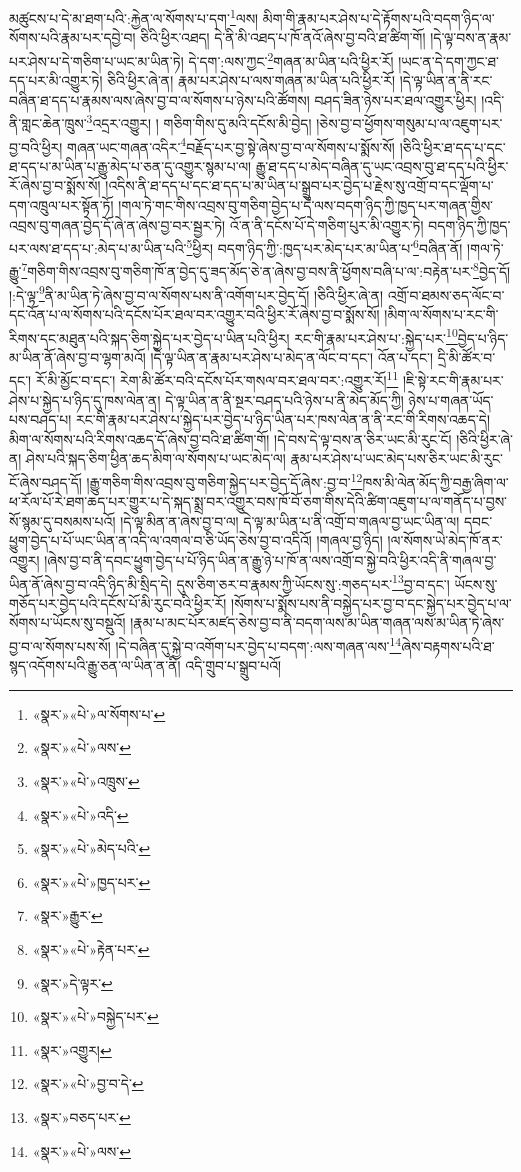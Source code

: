མཚུངས་པ་དེ་མ་ཐག་པའི་:རྐྱེན་ལ་སོགས་པ་དག་\footnote{«སྣར་»«པེ་»ལ་སོགས་པ་}ལས། མིག་གི་རྣམ་པར་ཤེས་པ་དེ་རྟོགས་པའི་བདག་ཉིད་ལ་སོགས་པའི་རྣམ་པར་དབྱེ་བ། ཅིའི་ཕྱིར་འཐད། དེ་ནི་མི་འཐད་པ་ཁོ་ནའོ་ཞེས་བྱ་བའི་ཐ་ཚིག་གོ། །དེ་ལྟ་བས་ན་རྣམ་པར་ཤེས་པ་དེ་གཅིག་པ་ཡང་མ་ཡིན་ཏེ། དེ་དག་:ལས་ཀྱང་\footnote{«སྣར་»«པེ་»ལས་}གཞན་མ་ཡིན་པའི་ཕྱིར་རོ། །ཡང་ན་དེ་དག་ཀྱང་ཐ་དད་པར་མི་འགྱུར་ཏེ། ཅིའི་ཕྱིར་ཞེ་ན། རྣམ་པར་ཤེས་པ་ལས་གཞན་མ་ཡིན་པའི་ཕྱིར་རོ། །དེ་ལྟ་ཡིན་ན་ནི་རང་བཞིན་ཐ་དད་པ་རྣམས་ལས་ཞེས་བྱ་བ་ལ་སོགས་པ་ཉེས་པའི་ཚོགས། བཤད་ཟིན་ཉེས་པར་ཐལ་འགྱུར་ཕྱིར། །འདི་ནི་གླང་ཆེན་ཁྲུས་\footnote{«སྣར་»«པེ་»འཁྲུས་}འདྲར་འགྱུར། །
གཅིག་གིས་དུ་མའི་དངོས་མི་བྱེད། །ཅེས་བྱ་བ་ཕྱོགས་གསུམ་པ་ལ་འཇུག་པར་བྱ་བའི་ཕྱིར། གཞན་ཡང་གཞན་འདིར་\footnote{«སྣར་»«པེ་»འདི་}བརྗོད་པར་བྱ་སྟེ་ཞེས་བྱ་བ་ལ་སོགས་པ་སྨོས་སོ། །ཅིའི་ཕྱིར་ཐ་དད་པ་དང་ཐ་དད་པ་མ་ཡིན་པ་རྒྱུ་མེད་པ་ཅན་དུ་འགྱུར་སྙམ་པ་ལ། རྒྱུ་ཐ་དད་པ་མེད་བཞིན་དུ་ཡང་འབྲས་བུ་ཐ་དད་པའི་ཕྱིར་རོ་ཞེས་བྱ་བ་སྨོས་སོ། །འདིས་ནི་ཐ་དད་པ་དང་ཐ་དད་པ་མ་ཡིན་པ་སྒྲུབ་པར་བྱེད་པ་རྗེས་སུ་འགྲོ་བ་དང་ལྡོག་པ་དག་འཁྲུལ་པར་སྟོན་ཏོ། །གལ་ཏེ་གང་གིས་འབྲས་བུ་གཅིག་བྱེད་པ་དེ་ལས་བདག་ཉིད་ཀྱི་ཁྱད་པར་གཞན་གྱིས་འབྲས་བུ་གཞན་བྱེད་དོ་ཞེ་ན་ཞེས་བྱ་བར་སྦྱར་ཏེ། འོ་ན་ནི་དངོས་པོ་དེ་གཅིག་པུར་མི་འགྱུར་ཏེ། བདག་ཉིད་ཀྱི་ཁྱད་པར་ལས་ཐ་དད་པ་:མེད་པ་མ་ཡིན་པའི་\footnote{«སྣར་»«པེ་»མེད་པའི་}ཕྱིར། བདག་ཉིད་ཀྱི་:ཁྱད་པར་མེད་པར་མ་ཡིན་པ་\footnote{«སྣར་»«པེ་»ཁྱད་པར་}བཞིན་ནོ། །གལ་ཏེ་རྒྱུ་\footnote{«སྣར་»རྒྱུར་}གཅིག་གིས་འབྲས་བུ་གཅིག་ཁོ་ན་བྱེད་དུ་ཟད་མོད་ཅེ་ན་ཞེས་བྱ་བས་ནི་ཕྱོགས་བཞི་པ་ལ་:བརྟེན་པར་\footnote{«སྣར་»«པེ་»རྟེན་པར་}བྱེད་དོ། །:དེ་ལྟ་\footnote{«སྣར་»དེ་ལྟར་}ནི་མ་ཡིན་ཏེ་ཞེས་བྱ་བ་ལ་སོགས་པས་ནི་འགོག་པར་བྱེད་དོ། །ཅིའི་ཕྱིར་ཞེ་ན། འགྲོ་བ་ཐམས་ཅད་ལོང་བ་དང་འོན་པ་ལ་སོགས་པའི་དངོས་པོར་ཐལ་བར་འགྱུར་བའི་ཕྱིར་རོ་ཞེས་བྱ་བ་སྨོས་སོ། །མིག་ལ་སོགས་པ་རང་གི་རིགས་དང་མཐུན་པའི་སྐད་ཅིག་སྐྱེད་པར་བྱེད་པ་ཡིན་པའི་ཕྱིར། རང་གི་རྣམ་པར་ཤེས་པ་:སྐྱེད་པར་\footnote{«སྣར་»«པེ་»བསྐྱེད་པར་}བྱེད་པ་ཉིད་མ་ཡིན་ནོ་ཞེས་བྱ་བ་ལྷག་མའོ། །དེ་ལྟ་ཡིན་ན་རྣམ་པར་ཤེས་པ་མེད་ན་ལོང་བ་དང་། འོན་པ་དང་། དྲི་མི་ཚོར་བ་དང་། རོ་མི་མྱོང་བ་དང་། རེག་མི་ཚོར་བའི་དངོས་པོར་གསལ་བར་ཐལ་བར་:འགྱུར་རོ།\footnote{«སྣར་»འགྱུར།} །ཇི་སྟེ་རང་གི་རྣམ་པར་ཤེས་པ་སྐྱེད་པ་ཉིད་དུ་ཁས་ལེན་ན། དེ་ལྟ་ཡིན་ན་ནི་སྔར་བཤད་པའི་ཉེས་པ་ནི་མེད་མོད་ཀྱི། ཉེས་པ་གཞན་ཡོད་པས་བཤད་པ། རང་གི་རྣམ་པར་ཤེས་པ་སྐྱེད་པར་བྱེད་པ་ཉིད་ཡིན་པར་ཁས་ལེན་ན་ནི་རང་གི་རིགས་འཆད་དེ། མིག་ལ་སོགས་པའི་རིགས་འཆད་དོ་ཞེས་བྱ་བའི་ཐ་ཚིག་གོ། །དེ་བས་དེ་ལྟ་བས་ན་ཅིར་ཡང་མི་རུང་ངོ། །ཅིའི་ཕྱིར་ཞེ་ན། ཤེས་པའི་སྐད་ཅིག་ཕྱིན་ཆད་མིག་ལ་སོགས་པ་ཡང་མེད་ལ། རྣམ་པར་ཤེས་པ་ཡང་མེད་པས་ཅིར་ཡང་མི་རུང་ངོ་ཞེས་བཤད་དོ། །རྒྱུ་གཅིག་གིས་འབྲས་བུ་གཅིག་སྐྱེད་པར་བྱེད་དོ་ཞེས་:བྱ་བ་\footnote{«སྣར་»«པེ་»བྱ་བ་དེ་}ཁས་མི་ལེན་མོད་ཀྱི་བརྒྱ་ཞིག་ལ་ཕ་རོལ་པོ་རེ་ཐག་ཆད་པར་གྱུར་པ་དེ་སྐད་སྨྲ་བར་འགྱུར་བས་ཁོ་བོ་ཅག་གིས་དེའི་ཚིག་འཇུག་པ་ལ་གནོད་པ་བྱས་སོ་སྙམ་དུ་བསམས་པའོ། །དེ་ལྟ་མིན་ན་ཞེས་བྱ་བ་ལ། དེ་ལྟ་མ་ཡིན་པ་ནི་འགྲོ་བ་གཞལ་བྱ་ཡང་ཡིན་ལ། དབང་ཕྱུག་བྱེད་པ་པོ་ཡང་ཡིན་ན་འདི་ལ་འགལ་བ་ཅི་ཡོད་ཅེས་བྱ་བ་འདིའོ། །གཞལ་བྱ་ཉིད། །ལ་སོགས་ཡེ་མེད་ཁོ་ནར་འགྱུར། །ཞེས་བྱ་བ་ནི་དབང་ཕྱུག་བྱེད་པ་པོ་ཉིད་ཡིན་ན་རྒྱུ་ཉེ་པ་ཁོ་ན་ལས་འགྲོ་བ་སྐྱེ་བའི་ཕྱིར་འདི་ནི་གཞལ་བྱ་ཡིན་ནོ་ཞེས་བྱ་བ་འདི་ཉིད་མི་སྲིད་དེ། དུས་ཅིག་ཅར་བ་རྣམས་ཀྱི་ཡོངས་སུ་:གཅད་པར་\footnote{«སྣར་»བཅད་པར་}བྱ་བ་དང་། ཡོངས་སུ་གཅོད་པར་བྱེད་པའི་དངོས་པོ་མི་རུང་བའི་ཕྱིར་རོ། །སོགས་པ་སྨོས་པས་ནི་བསྐྱེད་པར་བྱ་བ་དང་སྐྱེད་པར་བྱེད་པ་ལ་སོགས་པ་ཡོངས་སུ་བསྡུའོ། །རྣམ་པ་མང་པོར་མཛད་ཅེས་བྱ་བ་ནི་བདག་ལས་མ་ཡིན་གཞན་ལས་མ་ཡིན་ཏེ་ཞེས་བྱ་བ་ལ་སོགས་པས་སོ། །དེ་བཞིན་དུ་སྐྱེ་བ་འགོག་པར་བྱེད་པ་བདག་:ལས་གཞན་ལས་\footnote{«སྣར་»«པེ་»ལས་}ཞེས་བརྟགས་པའི་ཐ་སྙད་འདོགས་པའི་རྒྱུ་ཅན་ལ་ཡིན་ན་ནི། འདི་གྲུབ་པ་སྒྲུབ་པའོ། 